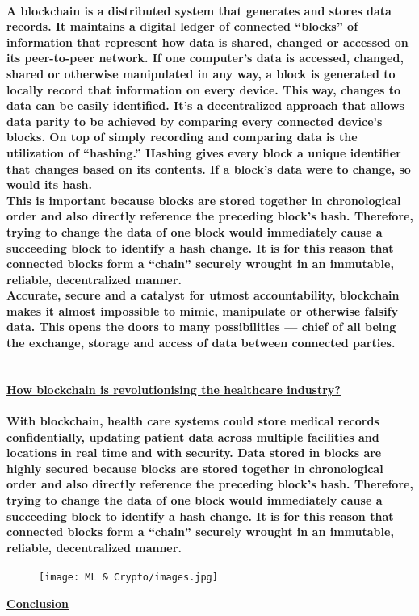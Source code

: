 \documentclass{article}
\begin{document}
    \paragraph{A blockchain is a distributed system that generates and stores data records. It maintains a digital ledger of connected “blocks” of information that represent how data is shared, changed or accessed on its peer-to-peer network. If one computer’s data is accessed, changed, shared or otherwise manipulated in any way, a block is generated to locally record that information on every device. This way, changes to data can be easily identified. It’s a decentralized approach that allows data parity to be achieved by comparing every connected device’s blocks. On top of simply recording and comparing data is the utilization of “hashing.” Hashing gives every block a unique identifier that changes based on its contents. If a block’s data were to change, so would its hash. \\
    This is important because blocks are stored together in chronological order and also directly reference the preceding block’s hash. Therefore, trying to change the data of one block would immediately cause a succeeding block to identify a hash change. It is for this reason that connected blocks form a “chain” securely wrought in an immutable, reliable, decentralized manner.  \\
    Accurate, secure and a catalyst for utmost accountability, blockchain makes it almost impossible to mimic, manipulate or otherwise falsify data. This opens the doors to many possibilities — chief of all being the exchange, storage and access of data between connected parties.\\\\
    }
    \textbf{\underline{How blockchain is revolutionising the healthcare industry?}}
    \paragraph{With blockchain, health care systems could store medical records confidentially, updating patient data across multiple facilities and locations in real time and with security. Data stored in blocks are highly secured because blocks are stored together in chronological order and also directly reference the preceding block’s hash. Therefore, trying to change the data of one block would immediately cause a succeeding block to identify a hash change. It is for this reason that connected blocks form a “chain” securely wrought in an immutable, reliable, decentralized manner.  }
    \begin{figure}[h]
        \centering
    	\texttt{[image: ML \& Crypto/images.jpg]}
    \end{figure}
    \clearpage
    \textbf{\underline{\Large Conclusion}}
\end{document}
